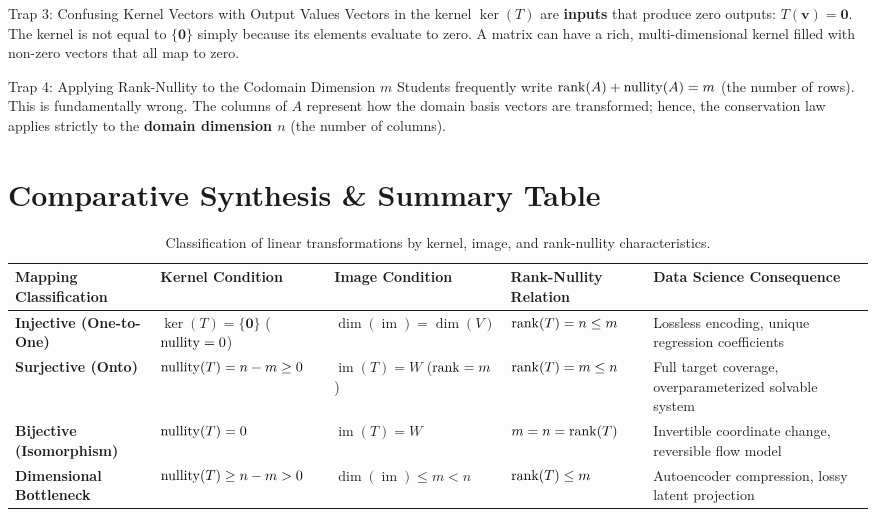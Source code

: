 \begin{trapbox}{Trap 3: Confusing Kernel Vectors with Output Values}
Vectors in the kernel $\ker(T)$ are \textbf{inputs} that produce zero outputs: $T(\mathbf{v}) = \mathbf{0}$. The kernel is not equal to $\{\mathbf{0}\}$ simply because its elements evaluate to zero. A matrix can have a rich, multi-dimensional kernel filled with non-zero vectors that all map to zero.
\end{trapbox}

\begin{trapbox}{Trap 4: Applying Rank-Nullity to the Codomain Dimension $m$}
Students frequently write $\operatorname{rank}(A) + \operatorname{nullity}(A) = m$ (the number of rows). This is fundamentally wrong. The columns of $A$ represent how the domain basis vectors are transformed; hence, the conservation law applies strictly to the \textbf{domain dimension $n$} (the number of columns).
\end{trapbox}

\section{Comparative Synthesis \& Summary Table}

\begin{table}[htbp]
\centering
\small
\begin{tabular}{p{3.0cm} p{2.2cm} p{2.5cm} p{2.8cm} p{3.2cm}}
\toprule
\textbf{Mapping Classification} & \textbf{Kernel Condition} & \textbf{Image Condition} & \textbf{Rank-Nullity Relation} & \textbf{Data Science Consequence} \\
\midrule
\textbf{Injective (One-to-One)} & $\ker(T) = \{\mathbf{0}\}$ ($\operatorname{nullity} = 0$) & $\dim(\operatorname{im}) = \dim(V)$ & $\operatorname{rank}(T) = n \le m$ & Lossless encoding, unique regression coefficients \\
\textbf{Surjective (Onto)} & $\operatorname{nullity}(T) = n - m \ge 0$ & $\operatorname{im}(T) = W$ ($\operatorname{rank} = m$) & $\operatorname{rank}(T) = m \le n$ & Full target coverage, overparameterized solvable system \\
\textbf{Bijective (Isomorphism)} & $\operatorname{nullity}(T) = 0$ & $\operatorname{im}(T) = W$ & $m = n = \operatorname{rank}(T)$ & Invertible coordinate change, reversible flow model \\
\textbf{Dimensional Bottleneck} & $\operatorname{nullity}(T) \ge n - m > 0$ & $\dim(\operatorname{im}) \le m < n$ & $\operatorname{rank}(T) \le m$ & Autoencoder compression, lossy latent projection \\
\bottomrule
\end{tabular}
\caption{Classification of linear transformations by kernel, image, and rank-nullity characteristics.}
\label{tab:rank_nullity_mapping_taxonomy}
\end{table}

